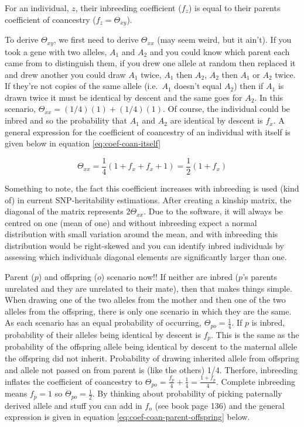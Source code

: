 \documentclass[
]{book}
\begin{document}
For an individual, \(z\), their inbreeding coefficient (\(f_z\)) is equal to their parents coefficient of coancestry (\(f_z = \Theta_{xy}\)).

To derive \(\Theta_{xy}\), we first need to derive \(\Theta_{xx}\) (may seem weird, but it ain't). If you took a gene with two alleles, \(A_1\) and \(A_2\) and you could know which parent each came from to distinguish them, if you drew one allele at random then replaced it and drew another you could draw \(A_1\) twice, \(A_1\) then \(A_2\), \(A_2\) then \(A_1\) or \(A_2\) twice. If they're not copies of the same allele (i.e.~\(A_1\) doesn't equal \(A_2\)) then if \(A_1\) is drawn twice it must be identical by descent and the same goes for \(A_2\). In this scenario, \(\Theta_{xx} = (1/4)(1) + (1/4)(1)\). Of course, the individual could be inbred and so the probability that \(A_1\) and \(A_2\) are identical by descent is \(f_x\). A general expression for the coefficient of coancestry of an individual with itself is given below in equation \eqref{eq:coef-coan-itself}

\begin{equation}
  \Theta_{xx} = \frac{1}{4}(1 + f_x + f_x + 1) = \frac{1}{2}(1 + f_x)
  \label{eq:coef-coan-itself}
\end{equation}

Something to note, the fact this coefficient increases with inbreeding is used (kind of) in current SNP-heritability estimations. After creating a kinship matrix, the diagonal of the matrix represents \(2\Theta_{xx}\). Due to the software, it will always be centred on one (mean of one) and without inbreeding expect a normal distribution with small variation around the mean, and with inbreeding this distribution would be right-skewed and you can identify inbred individuals by assessing which individuals diagonal elements are significantly larger than one.

Parent (\(p\)) and offspring (\(o\)) scenario now!! If neither are inbred (\(p\)'s parents unrelated and they are unrelated to their mate), then that makes things simple. When drawing one of the two alleles from the mother and then one of the two alleles from the offspring, there is only one scenario in which they are the same. As each scenario has an equal probability of occurring, \(\Theta_{po} = \frac{1}{4}\). If \(p\) is inbred, probability of their alleles being identical by descent is \(f_p\). This is the same as the probability of the offspring allele being identical by descent to the maternal allele the offspring did not inherit. Probability of drawing inherited allele from offspring and allele not passed on from parent is (like the others) 1/4. Therfore, inbreeding inflates the coefficient of coancestry to \(\Theta_{po} = \frac{f_p}{4} + \frac{1}{4} = \frac{1 + f_p}{4}\). Complete inbreeding means \(f_p = 1\) so \(\Theta_{po} = \frac{1}{2}\). By thinking about probability of picking paternally derived allele and stuff you can add in \(f_o\) (see book page 136) and the general expression is given in equation \eqref{eq:coef-coan-parent-offspring} below.
\end{document}
